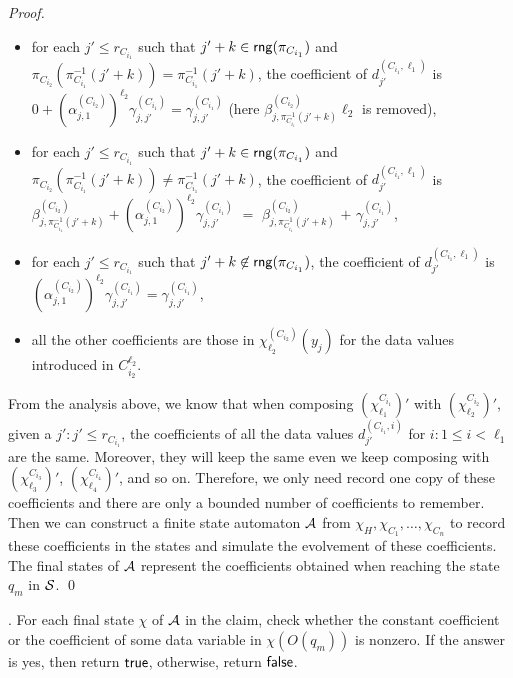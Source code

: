 \begin{proof}
\begin{itemize}
%
\item for each $ j' \le r_{C_{i_1}}$ such that $j'+k \in \mathsf{rng}(\pi_{C_{i_1}})$ and $\pi_{C_{i_2}}(\pi^{-1}_{C_{i_1}}(j'+k))=\pi^{-1}_{C_{i_1}}(j'+k)$, the coefficient of $d^{(C_{i_1},\ell_1)}_{j'}$ is $0 + (\alpha^{(C_{i_2})}_{j,1})^{\ell_2} \gamma^{(C_{i_1})}_{j,j'} = \gamma^{(C_{i_1})}_{j,j'}$ (here $\beta^{(C_{i_2})}_{j, \pi^{-1}_{C_{i_1}}(j'+k)} \ell_2$ is removed),
%
\item for each $ j' \le r_{C_{i_1}}$ such that $j'+k \in \mathsf{rng}(\pi_{C_{i_1}})$ and $\pi_{C_{i_2}}(\pi^{-1}_{C_{i_1}}(j'+k)) \neq \pi^{-1}_{C_{i_1}}(j'+k)$, the coefficient of $d^{(C_{i_1},\ell_1)}_{j'}$ is $\beta^{(C_{i_2})}_{j, \pi^{-1}_{C_{i_1}}(j'+k)} + (\alpha^{(C_{i_2})}_{j,1})^{\ell_2} \gamma^{(C_{i_1})}_{j,j'}$ $=$ $\beta^{(C_{i_2})}_{j, \pi^{-1}_{C_{i_1}}(j'+k)}$ $+$ $\gamma^{(C_{i_1})}_{j,j'}$,
%
\item for each $j' \le r_{C_{i_1}}$ such that $j'+k \not \in \mathsf{rng}(\pi_{C_{i_1}})$, the coefficient of $d^{(C_{i_1},\ell_1)}_{j'}$ is $(\alpha^{(C_{i_2})}_{j,1})^{\ell_2} \gamma^{(C_{i_1})}_{j,j'} = \gamma^{(C_{i_1})}_{j,j'}$,
%
\item all the other coefficients are those in $\chi^{(C_{i_2})}_{\ell_2}(y_j)$ for the data values introduced in $C^{\ell_2}_{i_2}$.
\end{itemize} 
From the analysis above, we know that when composing $(\chi^{C_{i_1}}_{\ell_1})'$ with $(\chi^{C_{i_2}}_{\ell_2})'$, given a $j': j' \le r_{C_{i_1}}$, the coefficients of all the data values $d^{(C_{i_1},i)}_{j'}$ for $i: 1 \le i < \ell_1$ are the same. Moreover, they will keep the same even we keep composing with $(\chi^{C_{i_3}}_{\ell_3})'$, $(\chi^{C_{i_4}}_{\ell_4})'$, and so on. Therefore, we only need record one copy of these coefficients and there are only a bounded number of coefficients to remember. Then we can construct a finite state automaton ${\mathcal{A} }$ from $\chi_H,\chi_{C_1},\dots,\chi_{C_n}$ to record these coefficients in the states and simulate the evolvement of these coefficients. The final states of ${\mathcal{A} }$ represent the coefficients obtained when reaching the state $q_m$ in ${\mathcal{S} }$. \qed
\end{proof}

\medskip 

. For each final state $\chi$ of ${\mathcal{A} }$ in the claim, check whether the constant coefficient or the coefficient of some data variable in $\chi(O(q_m))$ is nonzero. If the answer is yes, then return $\mathsf{true}$, otherwise, return $\mathsf{false}$.


